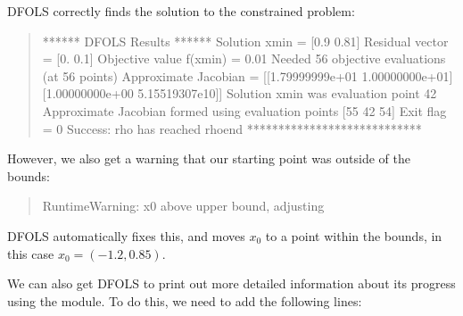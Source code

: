 \documentclass[letterpaper,10pt,english]{sphinxmanual}
\begin{document}
\sphinxAtStartPar
DFO\sphinxhyphen{}LS correctly finds the solution to the constrained problem:
\begin{quote}

\begin{sphinxVerbatim}[commandchars=\\\{\}]
****** DFO\PYGZhy{}LS Results ******
Solution xmin = [0.9  0.81]
Residual vector = [0.  0.1]
Objective value f(xmin) = 0.01
Needed 56 objective evaluations (at 56 points)
Approximate Jacobian = [[\PYGZhy{}1.79999999e+01  1.00000000e+01]
 [\PYGZhy{}1.00000000e+00 \PYGZhy{}5.15519307e\PYGZhy{}10]]
Solution xmin was evaluation point 42
Approximate Jacobian formed using evaluation points [55 42 54]
Exit flag = 0
Success: rho has reached rhoend
****************************
\end{sphinxVerbatim}
\end{quote}

\sphinxAtStartPar
However, we also get a warning that our starting point was outside of the bounds:
\begin{quote}

\begin{sphinxVerbatim}[commandchars=\\\{\}]
RuntimeWarning: x0 above upper bound, adjusting
\end{sphinxVerbatim}
\end{quote}

\sphinxAtStartPar
DFO\sphinxhyphen{}LS automatically fixes this, and moves \(x_0\) to a point within the bounds, in this case \(x_0=(-1.2,0.85)\).

\sphinxAtStartPar
We can also get DFO\sphinxhyphen{}LS to print out more detailed information about its progress using the  module. To do this, we need to add the following lines:
\begin{quote}

\begin{sphinxVerbatim}[commandchars=\\\{\}]
 

\end{sphinxVerbatim}
\end{quote}
\end{document}
